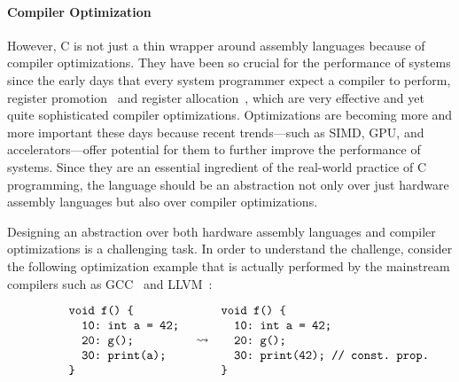 \paragraph{Compiler Optimization}

However, C is not just a thin wrapper around assembly languages because of compiler optimizations.
They have been so crucial for the performance of systems since the early days that every system
programmer expect a compiler to perform, \eg{} register promotion~\cite{reg-prom} and register
allocation~\cite{reg-alloc}, which are very effective and yet quite sophisticated compiler
optimizations.  Optimizations are becoming more and more important these days because recent
trends---such as SIMD, GPU, and accelerators---offer potential for them to further improve the
performance of systems.  Since they are an essential ingredient of the real-world practice of C
programming, the language should be an abstraction not only over just hardware assembly languages
but also over compiler optimizations.



Designing an abstraction over both hardware assembly languages and compiler optimizations is a
challenging task.  In order to understand the challenge, consider the following optimization example
that is actually performed by the mainstream compilers such as GCC~\cite{gcc} and LLVM~\cite{llvm}:

\[\begin{array}{rcl}
\begin{minipage}{0.27\textwidth}
\begin{verbatim}
void f() {
  10: int a = 42;
  20: g();
  30: print(a);
}
\end{verbatim}
\end{minipage}
&
\optarrow
&
\begin{minipage}{0.4\textwidth}
\begin{verbatim}
void f() {
  10: int a = 42;
  20: g();
  30: print(42); // const. prop.
}
\end{verbatim}
\end{minipage}
\end{array}\]


